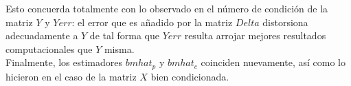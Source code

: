 \documentclass[letterpaper]{article}
\newcommand{\1}{\mathds{1}}
\theoremstyle{definition}
\theoremstyle{definition}
\theoremstyle{definition}
\theoremstyle{definition}
\theoremstyle{definition}
\begin{document}
\begin{enumerate}
\begin{enumerate}
            Esto concuerda totalmente con lo observado en el número de condición de la matriz $Y$ y $Yerr$: el 
            error que es añadido por la matriz $Delta$ distorsiona adecuadamente a $Y$ de tal forma que $Yerr$
            resulta arrojar mejores resultados computacionales que $Y$ misma.\\

            Finalmente, los estimadores $bmhat_p$ y $bmhat_c$ coinciden nuevamente, así como 
            lo hicieron en el caso de la matriz $X$ bien condicionada.
\end{enumerate}
\end{enumerate}
\end{document}
